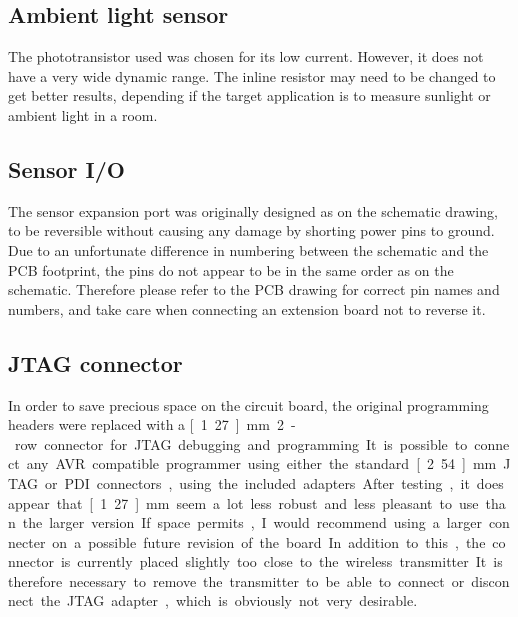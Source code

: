 \subsection{Ambient light sensor}
The phototransistor used was chosen for its low current. However, it does not
have a very wide dynamic range. The inline resistor may need to be changed to
get better results, depending if the target application is to measure sunlight
or ambient light in a room.

\subsection{Sensor I/O}
The sensor expansion port was originally designed as on the schematic drawing,
to be reversible without causing any damage by shorting power pins to ground.
Due to an unfortunate difference in numbering between the schematic and the PCB
footprint, the pins do not appear to be in the same order as on the schematic.
Therefore please refer to the PCB drawing for correct pin names and numbers, and
take care when connecting an extension board not to reverse it.

\subsection{JTAG connector}
In order to save precious space on the circuit board, the original programming
headers were replaced with a \unit[1.27]{mm} 2-row connector for JTAG debugging
and programming. It is possible to connect any AVR compatible programmer using
either the standard \unit[2.54]{mm} JTAG or PDI connectors, using the included
adapters.

After testing, it does appear that \unit[1.27]{mm} seem a lot less robust and
less pleasant to use than the larger version. If space permits, I would
recommend using a larger connecter on a possible future revision of the board.

In addition to this, the connector is currently placed slightly too close to the
wireless transmitter. It is therefore necessary to remove the transmitter to be
able to connect or disconnect the JTAG adapter, which is obviously not very
desirable.

